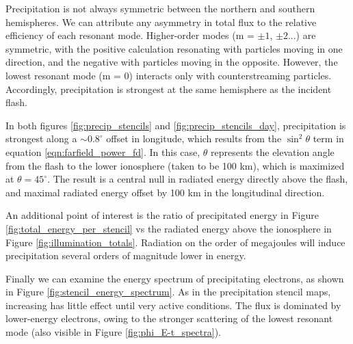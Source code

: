 Precipitation is not always symmetric between the northern and southern hemispheres. We can attribute any asymmetry in total flux to the relative efficiency of each resonant mode. Higher-order modes (m = $\pm 1$, $\pm 2$...) are symmetric, with the positive calculation resonating with particles moving in one direction, and the negative with particles moving in the opposite. However, the lowest resonant mode (m = 0) interacts only with counterstreaming particles. Accordingly, precipitation is strongest at the same hemisphere as the incident flash.

In both figures \ref{fig:precip_stencils} and \ref{fig:precip_stencils_day}, precipitation is strongest along a $\sim 0.8^\circ$ offset in longitude, which results from the $\sin^2\theta$ term in equation \eqref{eqn:farfield_power_fd}. In this case, $\theta$ represents the elevation angle from the flash to the lower ionosphere (taken to be 100 km), which is maximized at $\theta = 45^\circ$. The result is a central null in radiated energy directly above the flash, and maximal radiated energy offset by 100 km in the longitudinal direction.

An additional point of interest is the ratio of precipitated energy in Figure \ref{fig:total_energy_per_stencil} vs the radiated energy above the ionosphere in Figure \ref{fig:illumination_totals}. Radiation on the order of megajoules will induce precipitation several orders of magnitude lower in energy. 

Finally we can examine the energy spectrum of precipitating electrons, as shown in Figure \ref{fig:stencil_energy_spectrum}. As in the precipitation stencil maps, increasing \kp{} has little effect until very active conditions. The flux is dominated by lower-energy electrons, owing to the stronger scattering of the lowest resonant mode (also visible in Figure \ref{fig:phi_E-t_spectra}).

